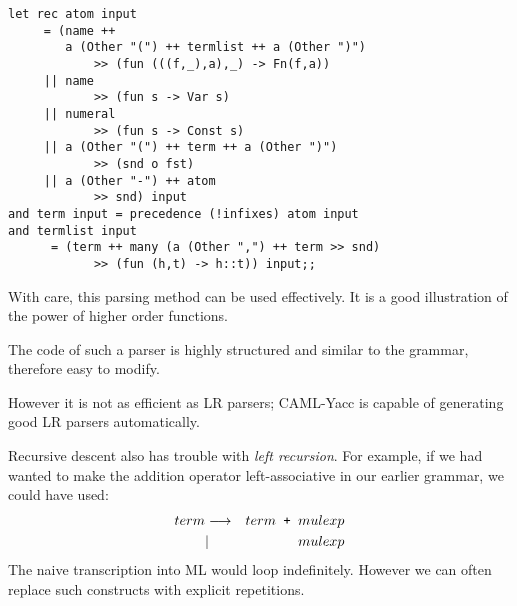 \begin{slide*}


\vspace*{0.5cm}

\begin{black}\begin{footnotesize}\begin{verbatim}
let rec atom input
     = (name ++
        a (Other "(") ++ termlist ++ a (Other ")")
            >> (fun (((f,_),a),_) -> Fn(f,a))
     || name
            >> (fun s -> Var s)
     || numeral
            >> (fun s -> Const s)
     || a (Other "(") ++ term ++ a (Other ")")
            >> (snd o fst)
     || a (Other "-") ++ atom
            >> snd) input
and term input = precedence (!infixes) atom input
and termlist input
      = (term ++ many (a (Other ",") ++ term >> snd)
            >> (fun (h,t) -> h::t)) input;;
\end{verbatim}\end{footnotesize}\end{black}

\end{slide*}



\begin{slide*}


\vspace*{0.3cm}

With care, this parsing method can be used effectively. It is a good
illustration of the power of higher order functions.

The code of such a parser is highly structured and similar to the grammar,
therefore easy to modify.

However it is not as efficient as LR parsers; CAML-Yacc is capable of
generating good LR parsers automatically.

Recursive descent also has trouble with {\em left recursion}. For example, if
we had wanted to make the addition operator left-associative in our earlier
grammar, we could have used:
{\red
\begin{eqnarray*}
term     & \goesto & term {\verb! + !} mulexp                   \\
         & |       & mulexp
\end{eqnarray*}}
The naive transcription into ML would loop indefinitely. However we can often
replace such constructs with explicit repetitions.


\end{slide*}





